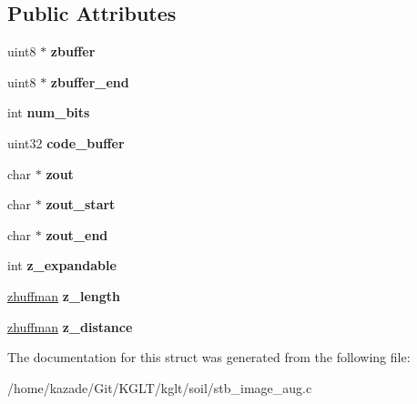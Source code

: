 \subsection*{Public Attributes}
\begin{DoxyCompactItemize}
\item 
\hypertarget{structzbuf_a7080eb91dcc67e1dfe818d08e6f22c4e}{uint8 $\ast$ {\bfseries zbuffer}}\label{structzbuf_a7080eb91dcc67e1dfe818d08e6f22c4e}

\item 
\hypertarget{structzbuf_af030baa17bebedd18272678da17a33f4}{uint8 $\ast$ {\bfseries zbuffer\-\_\-end}}\label{structzbuf_af030baa17bebedd18272678da17a33f4}

\item 
\hypertarget{structzbuf_acd069cdb4100884a732ad2794edbbdff}{int {\bfseries num\-\_\-bits}}\label{structzbuf_acd069cdb4100884a732ad2794edbbdff}

\item 
\hypertarget{structzbuf_a3bb8244d7be17801079c5a8587182edb}{uint32 {\bfseries code\-\_\-buffer}}\label{structzbuf_a3bb8244d7be17801079c5a8587182edb}

\item 
\hypertarget{structzbuf_aaf137c25fa5b9fb14e92354da4203c38}{char $\ast$ {\bfseries zout}}\label{structzbuf_aaf137c25fa5b9fb14e92354da4203c38}

\item 
\hypertarget{structzbuf_af31571e8d74c78c9bb18d92205150b28}{char $\ast$ {\bfseries zout\-\_\-start}}\label{structzbuf_af31571e8d74c78c9bb18d92205150b28}

\item 
\hypertarget{structzbuf_af07c0b7b7227f670ee1413bc0dcab791}{char $\ast$ {\bfseries zout\-\_\-end}}\label{structzbuf_af07c0b7b7227f670ee1413bc0dcab791}

\item 
\hypertarget{structzbuf_ae662f24e0973ca19b543e64647a6bfb6}{int {\bfseries z\-\_\-expandable}}\label{structzbuf_ae662f24e0973ca19b543e64647a6bfb6}

\item 
\hypertarget{structzbuf_a5906bdbe9dfb565339acac51af9efe89}{\hyperlink{structzhuffman}{zhuffman} {\bfseries z\-\_\-length}}\label{structzbuf_a5906bdbe9dfb565339acac51af9efe89}

\item 
\hypertarget{structzbuf_ae7d9588b2548708e14f3c6ad89bf26b5}{\hyperlink{structzhuffman}{zhuffman} {\bfseries z\-\_\-distance}}\label{structzbuf_ae7d9588b2548708e14f3c6ad89bf26b5}

\end{DoxyCompactItemize}


The documentation for this struct was generated from the following file\-:\begin{DoxyCompactItemize}
\item 
/home/kazade/\-Git/\-K\-G\-L\-T/kglt/soil/stb\-\_\-image\-\_\-aug.\-c\end{DoxyCompactItemize}

